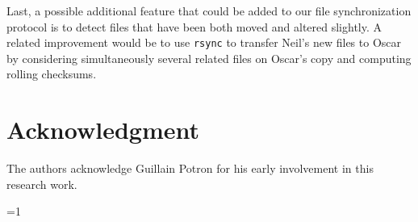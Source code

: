 \documentclass[twoside,envcountsame,runningheads]{llncs}
\newcommand{\rsync}{\texttt{rsync}\xspace}
\def\fullversion{0} %
\begin{document}
Last, a possible additional feature that could be added to our file synchronization protocol is to detect files that have been both moved and altered slightly. A related improvement would be to use \rsync to transfer Neil's new files to Oscar by considering simultaneously several related files on Oscar's copy and computing rolling checksums.


\section*{Acknowledgment}

The authors acknowledge Guillain Potron for his early involvement in this research work.



\nocite{rsync}



\appendix


\ifnum\fullversion=1
\end{document}

